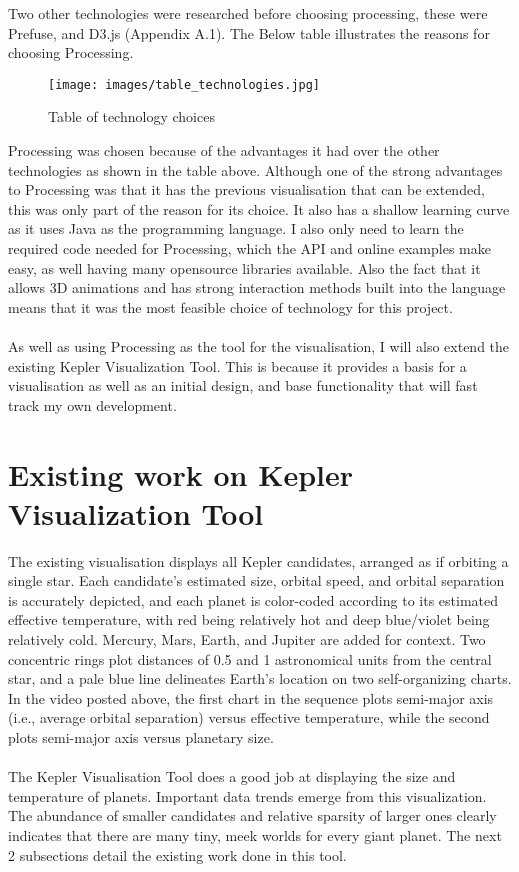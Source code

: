 \documentclass[11pt
              , a4paper
              , twoside
              , openright
              ]{report}
\begin{document}
Two other technologies were researched before choosing processing, these were
Prefuse, and D3.js (Appendix A.1). The Below table illustrates the reasons for
choosing Processing.
\clearpage
\begin{figure}[h!]
  \centering
      \texttt{[image: images/table\_technologies.jpg]}
  \caption{Table of technology choices}
\end{figure}
Processing was chosen because of the advantages it had over the other
technologies as shown in the table above. Although one of the strong advantages
to Processing was that it has the previous visualisation that can be extended,
this was only part of the reason for its choice. It also has a shallow learning
curve as it uses Java as the programming language. I also only need to learn the
required code needed for Processing, which the API and online examples make
easy, as well having many opensource libraries available. Also the fact that it
allows 3D animations and has strong interaction methods built into the language
means that it was the most feasible choice of technology for this project.
\\\\
As well as using Processing as the tool for the visualisation, I will also
extend the existing Kepler Visualization Tool. This is because it provides a
basis for a visualisation as well as an initial design, and base functionality
that will fast track my own development.

\section{Existing work on Kepler Visualization Tool \cite{kepler_article}}
The existing visualisation displays all Kepler candidates, arranged as if
orbiting a single star. Each candidate's estimated size, orbital speed, and
orbital separation is accurately depicted, and each planet is color-coded
according to its estimated effective temperature, with red being relatively hot
and deep blue/violet being relatively cold. Mercury, Mars, Earth, and Jupiter
are added for context. Two concentric rings plot distances of 0.5 and 1
astronomical units from the central star, and a pale blue line delineates
Earth's location on two self-organizing charts. In the video posted above, the
first chart in the sequence plots semi-major axis (i.e., average orbital
separation) versus effective temperature, while the second plots semi-major axis
versus planetary size.
\\\\
The Kepler Visualisation Tool does a good job at displaying the size and
temperature of planets. Important data trends emerge from this visualization.
The abundance of smaller candidates and relative sparsity of larger ones clearly
indicates that there are many tiny, meek worlds for every giant planet. The next
2 subsections detail the existing work done in this tool.
\end{document}
